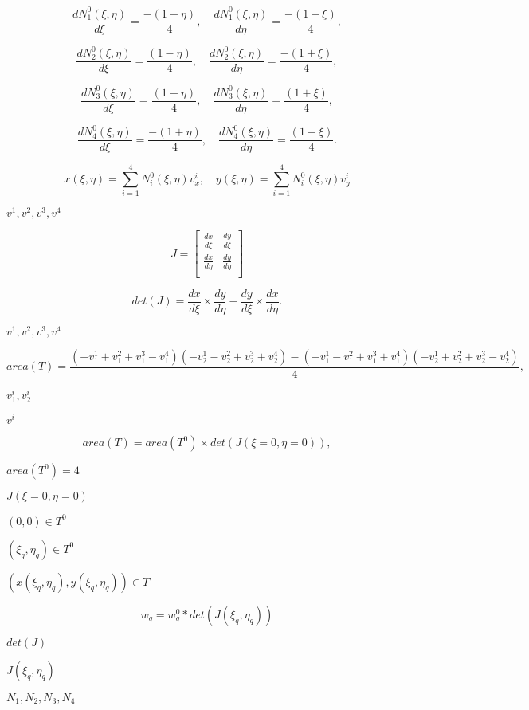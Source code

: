 \documentclass{article}
\begin{document}
\[\frac{d N^0_1(\xi, \eta)}{d\xi} = \frac{-(1 - \eta)}{4}, \quad \frac{d N^0_1(\xi, \eta)}{d\eta} = \frac{-(1 - \xi)}{4}, \]
\pagebreak

\[\frac{d N^0_2(\xi, \eta)}{d\xi} = \frac{(1 - \eta)}{4}, \quad \frac{d N^0_2 (\xi, \eta)}{d\eta} = \frac{-(1 + \xi)}{4}, \]
\pagebreak

\[\frac{d N^0_3(\xi, \eta)}{d\xi} = \frac{(1 + \eta)}{4}, \quad \frac{d N^0_3 (\xi, \eta)}{d\eta} = \frac{(1 + \xi)}{4}, \]
\pagebreak

\[\frac{d N^0_4(\xi, \eta)}{d\xi} = \frac{-(1 + \eta)}{4}, \quad \frac{d N^0_4 (\xi, \eta)}{d\eta} = \frac{(1 - \xi)}{4}. \]
\pagebreak

\[ x(\xi, \eta) = \sum_{i=1}^4 N^0_i(\xi, \eta) v^i_x, \quad y(\xi, \eta) = \sum_{i=1}^4 N^0_i(\xi, \eta) v^i_y \]
\pagebreak

$ v^1, v^2, v^3, v^4$
\pagebreak

\[ J = \left[ { \begin{array}{cc} \frac{dx}{d\xi} &\frac{dy}{d\xi} \\ \frac{dx}{d\eta} & \frac{dy}{d\eta} \\ \end{array} } \right] \]
\pagebreak

\[ det(J) = \frac{dx}{d\xi} \times \frac{dy}{d\eta} - \frac{dy}{d\xi}\times \frac{dx}{d\eta}. \]
\pagebreak

$ v^1, v^2, v^3, v^4 $
\pagebreak

\[ area(T) = \frac{(-v^1_1 + v^2_1 + v^3_1 - v^4_1) (-v^1_2 - v^2_2 + v^3_2 + v^4_2) - (-v^1_1 - v^2_1 + v^3_1 + v^4_1) (-v^1_2 + v^2_2 + v^3_2 - v^4_2)}{4}, \]
\pagebreak

$ v^i_1, v^i_2 $
\pagebreak

$ v^i $
\pagebreak

\[ area(T) = area(T^0) \times det(J(\xi = 0, \eta = 0)), \]
\pagebreak

$ area(T^0) = 4 $
\pagebreak

$ J(\xi = 0, \eta = 0) $
\pagebreak

$ (0,0) \in T^0 $
\pagebreak

$ (\xi_q, \eta_q) \in T^0 $
\pagebreak

$ (x(\xi_q, \eta_q), y(\xi_q, \eta_q)) \in T $
\pagebreak

\[ w_q = w^0_q * det(J(\xi_q, \eta_q)) \]
\pagebreak

$ det(J) $
\pagebreak

$ J(\xi_q, \eta_q)$
\pagebreak

$ N_1, N_2, N_3, N_4$
\pagebreak
\end{document}
